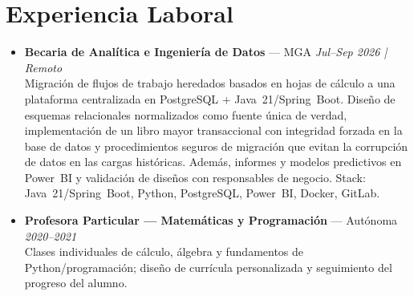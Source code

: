 \documentclass[10pt,a4paper]{article}
\begin{document}
\section{Experiencia Laboral}
{\small
\begin{itemize}

  \item \textbf{Becaria de Anal\'itica e Ingenier\'ia de Datos} --- MGA \hfill \textit{Jul--Sep 2026 | Remoto}\\
  Migraci\'on de flujos de trabajo heredados basados en hojas de c\'alculo a una plataforma centralizada en
  PostgreSQL + Java~21/Spring~Boot. Dise\~{n}o de esquemas relacionales normalizados como fuente \'unica de
  verdad, implementaci\'on de un libro mayor transaccional con integridad forzada en la base de datos y
  procedimientos seguros de migraci\'on que evitan la corrupci\'on de datos en las cargas hist\'oricas.
  Adem\'as, informes y modelos predictivos en Power~BI y validaci\'on de dise\~{n}os con responsables de negocio.
  Stack: Java~21/Spring~Boot, Python, PostgreSQL, Power~BI, Docker, GitLab.

  \item \textbf{Profesora Particular --- Matem\'aticas y Programaci\'on} --- Aut\'onoma \hfill \textit{2020--2021}\\
  Clases individuales de c\'alculo, \'algebra y fundamentos de Python/programaci\'on;
  dise\~{n}o de curr\'icula personalizada y seguimiento del progreso del alumno.

\end{itemize}
}

\end{document}
